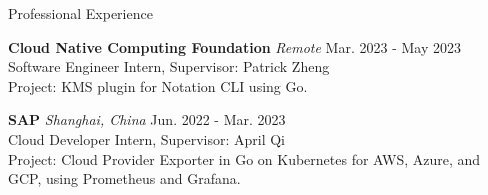 
\begin{rSection}{Professional Experience}
    
    
    
    \small{{\bf Cloud Native Computing Foundation} \textit{Remote} \hfill Mar. 2023 - May 2023
\\ Software Engineer Intern, Supervisor: Patrick Zheng
\\
Project: KMS plugin for Notation CLI using Go. 

\vspace{-1mm}
{\bf SAP} \textit{Shanghai, China} \hfill Jun. 2022 - Mar. 2023
\\ Cloud Developer Intern, Supervisor: April Qi
\\
Project: Cloud Provider Exporter in Go on Kubernetes for AWS, Azure, and GCP, using Prometheus and Grafana.
}
\vspace{-1mm}

    
    

\end{rSection}
